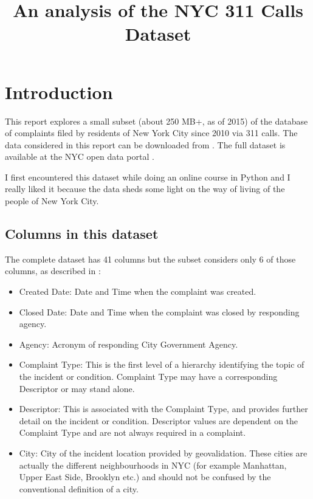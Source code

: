 \documentclass[12pt,a4paper]{article}
\begin{document}
\title{An analysis of the NYC 311 Calls Dataset}

\maketitle


\vspace{+10mm}
\tableofcontents


\vspace{+10mm}
\section{Introduction}
This report explores a small subset (about 250 MB+, as of 2015) of the database of complaints filed by residents of New York City since 2010 via 311 calls. The data considered in this report can be downloaded from \cite{subset}. The full dataset is available at the NYC open data portal \cite{nycdatafull}.

I first encountered this dataset while doing an online course in Python and I really liked it because the data sheds some light on the way of living of the people of New York City.

\subsection{Columns in this dataset}
The complete dataset has 41 columns but the subset considers only 6 of those columns, as described in \cite{nycdatafull}:
\begin{itemize}
    \item Created Date: Date and Time when the complaint was created.
    \item Closed Date: Date and Time when the complaint was closed by responding agency.
    \item Agency: Acronym of responding City Government Agency.
    \item Complaint Type: This is the first level of a hierarchy identifying the topic of the incident or condition. Complaint Type may have a corresponding Descriptor or may stand alone.
    \item Descriptor: This is associated with the Complaint Type, and provides further detail on the incident or condition. Descriptor values are dependent on the Complaint Type and are not always required in a complaint.
    \item City: City of the incident location provided by geovalidation. These cities are actually the different neighbourhoods in NYC (for example Manhattan, Upper East Side, Brooklyn etc.) and should not be confused by the conventional definition of a city.
\end{itemize}
\end{document}
